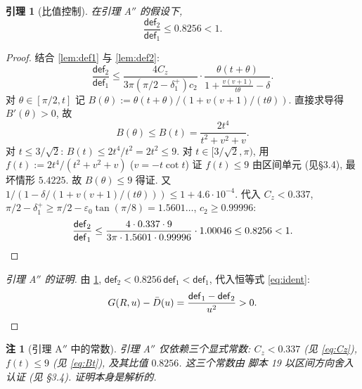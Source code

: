 \documentclass[UTF8]{ctexart}
\newtheorem{lemma}[theorem]{引理}
\newtheorem{remark}[theorem]{注}
\begin{document}
\begin{lemma}[比值控制]\label{lem:ratio}
在引理 A$''$ 的假设下,
\begin{equation}
	\frac{\mathsf{def}_2}{\mathsf{def}_1}\le0.8256<1.
\end{equation}
\end{lemma}
\begin{proof}
结合 \ref{lem:def1} 与 \ref{lem:def2}:
\begin{equation}
	\frac{\mathsf{def}_2}{\mathsf{def}_1}
	\le\frac{4C_z}{3\pi(\pi/2-\delta_1^+)c_2}\cdot
	\frac{\theta(t+\theta)}{1+\frac{v(v+1)}{t\theta}-\delta}.
\end{equation}
对 $\theta\in[\pi/2,t]$ 记 $B(\theta):=\theta(t+\theta)/(1+v(v+1)/(t\theta))$.
直接求导得 $B'(\theta)>0$, 故
\begin{equation}
	B(\theta)\le B(t)=\frac{2t^4}{t^2+v^2+v}.
	\label{eq:Bt}
\end{equation}
对 $t\le3/\sqrt2$: $B(t)\le2t^4/t^2=2t^2\le9$. 对 $t\in[3/\sqrt2,\pi)$,
用 $f(t):=2t^4/(t^2+v^2+v)$ ($v=-t\cot t$) 证 $f(t)\le9$ 由区间单元 (见§3.4),
最坏情形 $5.4225$. 故 $B(\theta)\le9$ 得证.
又 $1/(1-\delta/(1+v(v+1)/(t\theta)))\le1+4.6\cdot10^{-4}$.
代入 $C_z<0.337$, $\pi/2-\delta_1^+\ge\pi/2-\varepsilon_0\tan(\pi/8)=1.5601\ldots$,
$c_2\ge0.99996$:
\begin{equation}
	\frac{\mathsf{def}_2}{\mathsf{def}_1}
	\le\frac{4\cdot0.337\cdot9}{3\pi\cdot1.5601\cdot0.99996}\cdot1.00046
	\le0.8256<1.
	\qedhere
\end{equation}
\end{proof}

\begin{proof}[引理 A$''$ 的证明]
由 \ref{lem:ratio}, $\mathsf{def}_2<0.8256\,\mathsf{def}_1<\mathsf{def}_1$,
代入恒等式 \eqref{eq:ident}:
\begin{equation}
	G(R,u)-\bar D(u)=\frac{\mathsf{def}_1-\mathsf{def}_2}{u^2}>0.
	\qedhere
\end{equation}
\end{proof}

\begin{remark}[引理 A$''$ 中的常数]
引理 A$''$ 仅依赖三个显式常数: $C_z<0.337$ (见 \eqref{eq:Cz}), $f(t)\le9$ (见 \eqref{eq:Bt}),
及其比值 $0.8256$. 这三个常数由
脚本 19 以区间方向舍入认证 (见 §3.4). 证明本身是解析的.
\end{remark}
\end{document}
